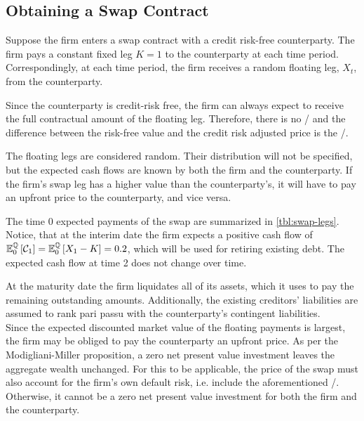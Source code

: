 \documentclass[main.tex]{subfiles}
\begin{document}
    \subsection{Obtaining a Swap Contract}
        Suppose the firm enters a swap contract with a credit risk-free counterparty.
        The firm pays a constant fixed leg $K=\num{1}$ to the counterparty at each time period.
        Correspondingly, at each time period,
        the firm receives a random floating leg, $X_t$, from the counterparty.

        Since the counterparty is credit-risk free,
        the firm can always expect to receive the full contractual amount of the floating leg.
        Therefore, there is no \CVA/ and
        the difference between the risk-free value and the credit risk adjusted price is the \DVA/.

        The floating legs are considered random.
        Their distribution will not be specified,
        but the expected cash flows are known
        by both the firm and the counterparty.
        If the firm's swap leg has a higher value than the counterparty's,
        it will have to pay an upfront price to the counterparty,
        and vice versa.

        The time 0 expected payments of the swap are summarized in \cref{tbl:swap-legs}.
        Notice, that at the interim date the firm expects a positive cash flow of
        $\mathbb{E}_{0}^{\mathbb{Q}}\left[\mathcal{C}_1\right] = \mathbb{E}_{0}^{\mathbb{Q}}\left[X_1 - K\right] = \num{0.2}$,
        which will be used for retiring existing debt.
        The expected cash flow at time 2 does not change over time.

        At the maturity date the firm liquidates all of its assets,
        which it uses to pay the remaining outstanding amounts.
        Additionally, the existing creditors' liabilities are assumed to rank pari passu with the counterparty's contingent liabilities.
        \\
        Since the expected discounted market value of the floating payments is largest,
        the firm may be obliged to pay the counterparty an upfront price.
        As per the Modigliani-Miller proposition, 
        a zero net present value investment leaves the aggregate wealth unchanged.
        For this to be applicable, the price of the swap must also account for the firm's own default risk,
        i.e. include the aforementioned \DVA/.
        Otherwise, it cannot be a zero net present value investment for both the firm and the counterparty.
\end{document}
